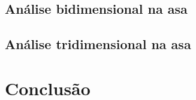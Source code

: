 

\subsection{Análise bidimensional na asa}

\subsection{Análise tridimensional na asa}

\section{Conclusão}
